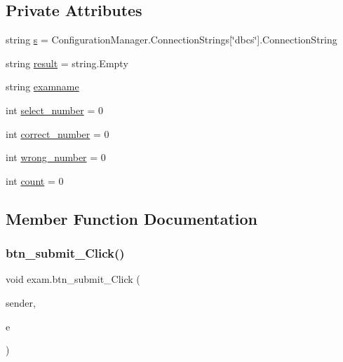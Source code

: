 \subsection*{Private Attributes}
\begin{DoxyCompactItemize}
\item 
string \mbox{\hyperlink{classexam_ac6f839121cd7992e5c54d3b8b2711d0f}{s}} = Configuration\+Manager.\+Connection\+Strings\mbox{[}\char`\"{}dbcs\char`\"{}\mbox{]}.Connection\+String
\item 
string \mbox{\hyperlink{classexam_a3d6a6de9a1d05e7763066597ceafabbb}{result}} = string.\+Empty
\item 
string \mbox{\hyperlink{classexam_a8cc8fbb089450d018a07155af84532fb}{examname}}
\item 
int \mbox{\hyperlink{classexam_ab4df7c7aa857cb162d3b383e900c017c}{select\+\_\+number}} = 0
\item 
int \mbox{\hyperlink{classexam_af01ef9946fbf30e3762ab32c74c42176}{correct\+\_\+number}} = 0
\item 
int \mbox{\hyperlink{classexam_a2b91d7f5691387ef7244aaff89984a37}{wrong\+\_\+number}} = 0
\item 
int \mbox{\hyperlink{classexam_acd144f0582e8b0fdfc95e549d0f5f470}{count}} = 0
\end{DoxyCompactItemize}


\subsection{Member Function Documentation}
\mbox{\label{classexam_a63572b6a596a0ee29ff9482c7b737d12}} 
\subsubsection{\texorpdfstring{btn\_submit\_Click()}{btn\_submit\_Click()}}
{\footnotesize\ttfamily void exam.\+btn\+\_\+submit\+\_\+\+Click (\begin{DoxyParamCaption}\item[{object}]{sender,  }\item[{Event\+Args}]{e }\end{DoxyParamCaption})\hspace{0.3cm}{\ttfamily [protected]}}

\mbox{\label{classexam_a9cc83bde64452d20aa1259108a9c33a4}} 
